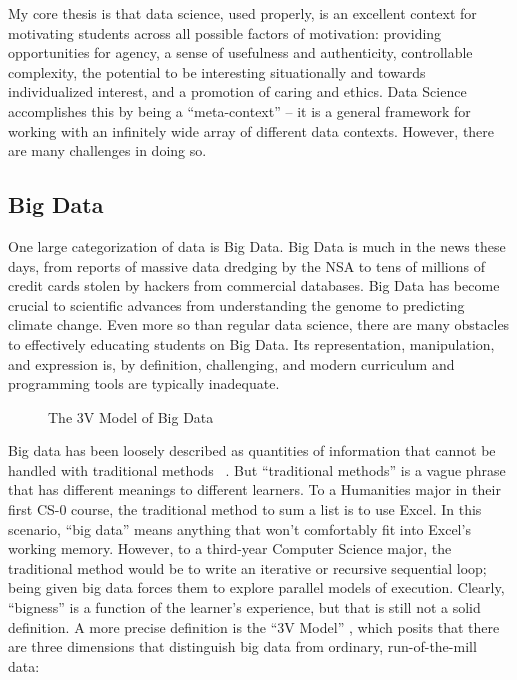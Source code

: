 My core thesis is that data science, used properly, is an excellent context for motivating students across all possible factors of motivation: providing opportunities for agency, a sense of usefulness and authenticity, controllable complexity, the potential to be interesting situationally and towards individualized interest, and a promotion of caring and ethics.
Data Science accomplishes this by being a ``meta-context'' -- it is a general framework for working with an infinitely wide array of different data contexts.
However, there are many challenges in doing so.

\subsection{Big Data}

One large categorization of data is Big Data. Big Data is much in the news these days, from reports of massive data
dredging by the NSA to tens of millions of credit cards stolen by
hackers from commercial databases.
Big Data has become crucial to scientific advances from understanding the
genome to predicting climate change.
Even more so than regular data science, there are many obstacles to effectively educating students on Big
Data.
Its representation, manipulation, and expression is, by definition, challenging, and modern curriculum and programming tools are typically inadequate.

\begin{wrapfigure}{r}{0.5\textwidth}
    \begin{center}
    \end{center}
    \vspace{-\bigskipamount}
    \caption{The 3V Model of Big Data}
    \label{fig-3v}
\end{wrapfigure}

Big data has been loosely described as quantities of information that cannot be handled with traditional methods ~\cite{McKinsey}.
But ``traditional methods'' is a vague phrase that has different meanings to different learners. To a Humanities major in their first CS-0 course, the traditional method to sum a list is to use Excel. In this scenario, ``big data'' means anything that won't comfortably fit into Excel's working memory.
However, to a third-year Computer Science major, the traditional method would be to write an iterative or recursive sequential loop; being given big data forces them to explore parallel models of execution.
Clearly, ``bigness'' is a function of the learner's experience, but that is still not a solid definition.
A more precise definition is the ``3V Model'' \cite{douglas2012importance}, which posits that there are three dimensions that distinguish big data from ordinary, run-of-the-mill data:


